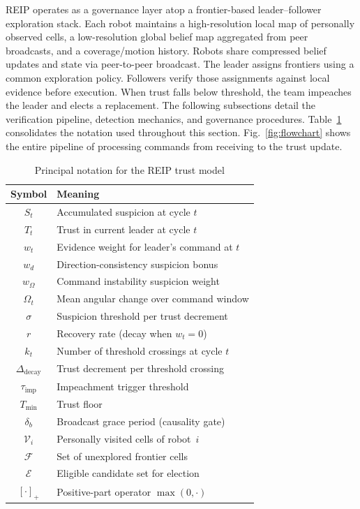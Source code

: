 \documentclass[conference]{IEEEtran}
\newcommand{\clip}[1]{\left[#1\right]_+}
\begin{document}
REIP operates as a governance layer atop a frontier-based leader--follower exploration stack. Each robot maintains a high-resolution local map of personally observed cells, a low-resolution global belief map aggregated from peer broadcasts, and a coverage/motion history. Robots share compressed belief updates and state via peer-to-peer broadcast. The leader assigns frontiers using a common exploration policy. Followers verify those assignments against local evidence before execution. When trust falls below threshold, the team impeaches the leader and elects a replacement. The following subsections detail the verification pipeline, detection mechanics, and governance procedures. Table~\ref{tab:notation} consolidates the notation used throughout this section. Fig.~\ref{fig:flowchart} shows the entire pipeline of processing commands from receiving to the trust update.

\begin{table}[t]
\centering
\caption{Principal notation for the REIP trust model}
\label{tab:notation}
\small
\begin{tabular}{@{}cl@{}}
\toprule
Symbol & Meaning \\
\midrule
$S_t$                    & Accumulated suspicion at cycle $t$ \\
$T_t$                    & Trust in current leader at cycle $t$ \\
$w_t$                    & Evidence weight for leader's command at $t$ \\
$w_d$                    & Direction-consistency suspicion bonus \\
$w_{\Omega}$             & Command instability suspicion weight \\
$\Omega_t$               & Mean angular change over command window \\
$\sigma$                 & Suspicion threshold per trust decrement \\
$r$                      & Recovery rate (decay when $w_t = 0$) \\
$k_t$                    & Number of threshold crossings at cycle $t$ \\
$\Delta_{\text{decay}}$  & Trust decrement per threshold crossing \\
$\tau_{\text{imp}}$      & Impeachment trigger threshold \\
$T_{\min}$               & Trust floor \\
$\delta_b$               & Broadcast grace period (causality gate) \\
$\mathcal{V}_i$          & Personally visited cells of robot~$i$ \\
$\mathcal{F}$            & Set of unexplored frontier cells \\
$\mathcal{E}$            & Eligible candidate set for election \\
$\clip{\cdot}$           & Positive-part operator $\max(0,\cdot)$ \\
\bottomrule
\end{tabular}
\end{table}
\end{document}
